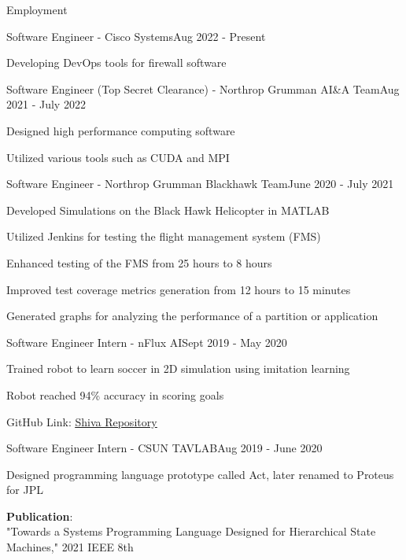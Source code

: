\documentclass{resume}
\begin{document}
\begin{rSection}{Employment}
    \begin{rSubsection}{Software Engineer - Cisco Systems}{Aug 2022 - Present}
        \item Developing DevOps tools for firewall software
    \end{rSubsection}
    \begin{rSubsection}{Software Engineer (Top Secret Clearance) - Northrop Grumman AI\&A Team}{Aug 2021 - July 2022}
        \item Designed high performance computing software
        \item Utilized various tools such as CUDA and MPI
    \end{rSubsection}
    \begin{rSubsection}{Software Engineer - Northrop Grumman Blackhawk Team}{June 2020 - July 2021}
        \item Developed Simulations on the Black Hawk Helicopter in MATLAB
        \item Utilized Jenkins for testing the flight management system (FMS)
        \item Enhanced testing of the FMS from 25 hours to 8 hours
        \item Improved test coverage metrics generation from 12 hours to 15 minutes
        \item Generated graphs for analyzing the performance of a partition or application
    \end{rSubsection}
    \begin{rSubsection}{Software Engineer Intern - nFlux AI}{Sept 2019 - May 2020}
        \item Trained robot to learn soccer in 2D simulation using imitation learning
        \item Robot reached 94\% accuracy in scoring goals
        \item GitHub Link: \href{https://github.com/nflux/Shiva}{\color{blue}\underline{Shiva Repository}}
    \end{rSubsection}
    \begin{rSubsection}{Software Engineer Intern - CSUN TAVLAB}{Aug 2019 - June 2020}
        \item Designed programming language prototype called Act, later renamed to Proteus for JPL
        \item \textbf{Publication}: \\
          "Towards a Systems Programming Language Designed for Hierarchical State Machines," 2021 IEEE 8th \\

\end{rSubsection}
\end{rSection}
\end{document}
